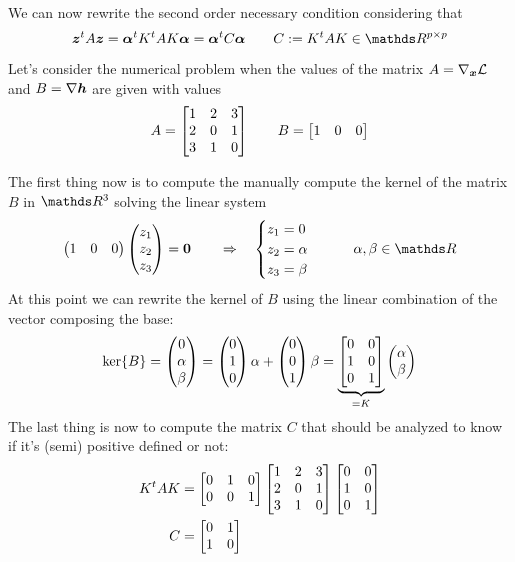 		We can now rewrite the second order necessary condition considering that
		\[ \vett z^t A \vett z = \vett \alpha^t K^t A K \vett \alpha = \vett \alpha^t C \vett \alpha  \qquad C := K^tAK \in \R^{p\times p} \]
		
		\begin{example}{}
			Let's consider the numerical problem when the values of the matrix $A = \nabla_{\boldsymbol{x}} \mathcal L$ and $B=\nabla \boldsymbol{h}$ are given with values
			\[ A = \begin{bmatrix} 1 & 2 & 3 \\ 2 & 0 & 1 \\ 3 & 1 & 0 \end{bmatrix} \qquad B = \begin{bmatrix} 1&0&0 \end{bmatrix} \]
			
			The first thing now is to compute the manually compute the kernel of the matrix $B$ in $\R^3$ solving the linear system
			\[ \vector{1 &0 &0} \vector{z_1 \\ z_2 \\ z_3} = \vett 0 \qquad \Rightarrow \quad \begin{cases}
				z_1 = 0 \\ z_2 = \alpha \\ z_3 = \beta
			\end{cases} \qquad \alpha,\beta\in\R \]
			At this point we can rewrite the kernel of $B$ using the linear combination of the vector composing the base:
			\[ \ker\{B\} = \begin{pmatrix} 0 \\ \alpha \\ \beta \end{pmatrix} = \begin{pmatrix} 0 \\ 1 \\ 0 \end{pmatrix} \alpha + \begin{pmatrix} 0 \\ 0 \\ 1 \end{pmatrix} \beta = \underbrace{\begin{bmatrix} 0 & 0 \\ 1 & 0 \\ 0 & 1 \end{bmatrix}}_{=K} \begin{pmatrix} \alpha \\ \beta \end{pmatrix} \]
			The last thing is now to compute the matrix $C$ that should be analyzed to know if it's (semi) positive defined or not:
			\begin{align*}
				K^t AK& = \begin{bmatrix} 0 & 1 & 0 \\ 0 & 0 & 1 \end{bmatrix} \begin{bmatrix} 1 & 2 & 3 \\ 2 & 0 & 1 \\ 3 & 1 & 0 \end{bmatrix} \begin{bmatrix} 0 & 0 \\ 1 & 0 \\ 0 & 1 \end{bmatrix} \\
				C & = \begin{bmatrix} 0&1\\1&0 \end{bmatrix}
			\end{align*}
			
		\end{example}
	
